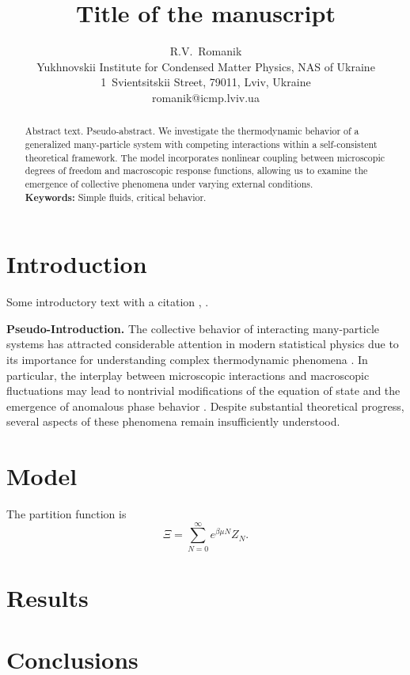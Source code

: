 \documentclass[12pt]{article}
\title{Title of the manuscript}
\author{R.V.~Romanik \orcidlink{0009-0008-2405-9038}
	\\ \small Yukhnovskii Institute for Condensed Matter Physics, NAS of Ukraine 
	\\ \small 1~Svientsitskii Street, 79011, Lviv, Ukraine 
	\\ \small romanik@icmp.lviv.ua}
\begin{document}
	
	\maketitle
	
	\begin{abstract}
		Abstract text. Pseudo-abstract. We investigate the thermodynamic behavior of a generalized many-particle system with competing interactions within a self-consistent theoretical framework. The model incorporates nonlinear coupling between microscopic degrees of freedom and macroscopic response functions, allowing us to examine the emergence of collective phenomena under varying external conditions.		
		\\[0.5cm]
		\textbf{Keywords:} Simple fluids, critical behavior.
	\end{abstract}
	
	\tableofcontents
	
	\section{Introduction}	
	Some introductory text with a citation
	\cite{RDKPS26a,RDKPS26b}, \cite{KD22}.
	
	\textbf{Pseudo-Introduction.} The collective behavior of interacting many-particle systems
	has attracted considerable attention in modern statistical
	physics due to its importance for understanding complex
	thermodynamic phenomena \cite{PLA99,HansenMcDonald13,Johnston14}.
	In particular, the interplay between microscopic interactions
	and macroscopic fluctuations may lead to nontrivial
	modifications of the equation of state and the emergence
	of anomalous phase behavior \cite{WM02,AW07}.
	Despite substantial theoretical progress, several aspects
	of these phenomena remain insufficiently understood.
	
	\section{Model}
	
	The partition function is
	\begin{equation}
		\Xi = \sum_{N=0}^{\infty}
		e^{\beta\mu N} Z_N.
	\end{equation}
	
	\section{Results}
	
	\section{Conclusions}
	
	
	
	
\end{document}
